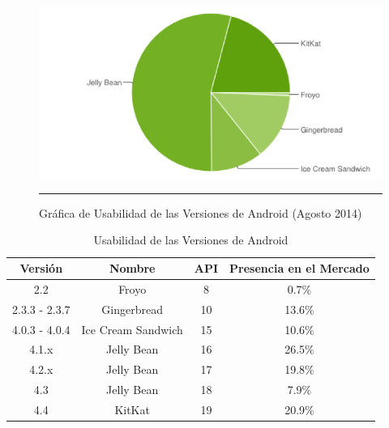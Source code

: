 \begin{figure}[htbp]
	\centering
		\includegraphics[width=1\textwidth]{Figuras/versionesAndroid.png}
		\rule{30em}{0.5pt}
	\caption[Gráfica de Usabilidad de las Versiones de Android]{Gráfica de Usabilidad de las Versiones de Android (Agosto 2014) \cite{devAndroid}}
	\label{fig:versionesFigura}
\end{figure}

\begin{table}[h] 
	\begin{center}
		\begin{tabular}{|c|c|c|c|}
			\hline \rowcolor[RGB]{0,102,204} 
			\textcolor{blanco}{\bf Versión} &
				\textcolor{blanco}{\bf Nombre} &
				\textcolor{blanco}{\bf API} &
				\textcolor{blanco}{\bf Presencia en el Mercado} \\
			\hline \rowcolor[RGB]{224,224,224} 
				2.2 &
				Froyo &
				8 &
				0.7\% \\
      		\hline 
      			2.3.3 - 2.3.7 &
				Gingerbread &
				10 &
				13.6\% \\
      		\hline \rowcolor[RGB]{224,224,224} 
      			4.0.3 - 4.0.4 &
				Ice Cream Sandwich &
				15 &
				10.6\% \\
      		\hline 
      			4.1.x &
				Jelly Bean &
				16 &
				26.5\% \\
      		\hline \rowcolor[RGB]{224,224,224} 
      			4.2.x &
				Jelly Bean &
				17 &
				19.8\% \\
      		\hline 
      			4.3 &
				Jelly Bean &
				18 &
				7.9\% \\
      		\hline \rowcolor[RGB]{224,224,224} 
      			4.4 &
				KitKat &
				19 &
				20.9\% \\
      		\hline 
		\end{tabular}
	\end{center}
	\caption[Usabilidad de las Versiones de Android]{Usabilidad de las Versiones de Android \cite{devAndroid}} 
	\label{tab:versionesTabla}
\end{table}


